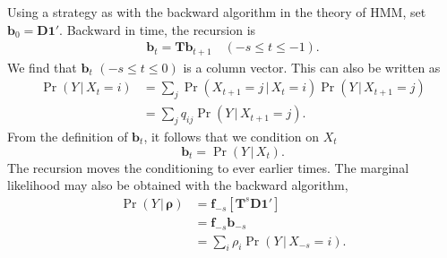 \documentclass[preprint]{elsarticle}
\newcommand{\bs}[1]{\ensuremath{\boldsymbol{#1}}}
\newcommand\given{{\,|\,}}
\newcommand\x[1]{\ensuremath{X_{#1}}}
\newcommand\y{\ensuremath{Y}}
\newcommand\s{\ensuremath{s}}
\newcommand\fv[1]{\ensuremath{\mathbf{f}_{#1}}}
\newcommand\bv[1]{\ensuremath{\mathbf{b}_{#1}}}
\newcommand\oneC{\ensuremath{\mathbf{1}'}}
\newcommand\oneR{\ensuremath{\mathbf{1}}}
\begin{document}
Using a strategy as with the backward algorithm in the theory of HMM, set $\bv{0}=\mathbf{D}\oneC$. Backward in time, the recursion is
\begin{equation}
\begin{split}
\bv{t} = \mathbf{T} \bv{t+1} \quad (-\s \le t \le -1).
\end{split}
\end{equation}
We find that $\bv{t}$ $(-\s \le t \le 0)$ is a column vector. This can also be written as
\begin{equation}\label{eq:backwards_discrete}
\begin{split}
\Pr(\y \given \x{t}=i) &= \sum_j \Pr(\x{t+1}=j \given \x{t}=i) \Pr(\y \given \x{t+1}=j) \\
&=\sum_j q_{ij} \Pr(\y \given \x{t+1}=j).
\end{split}
\end{equation}
From the definition of $\bv{t}$, it follows that we condition on $\x{t}$
\begin{equation}
\bv{t} = \Pr(\y \given \x{t}).
\end{equation}
The recursion moves the conditioning to ever earlier times. The marginal likelihood may also be obtained with the backward algorithm,
\begin{equation}\label{eq:marg_lh}
\begin{split}
\Pr(\y \given \bs{\rho}) &= \fv{-\s} \left[\mathbf{T}^s \mathbf{D}\oneC\right]\\
                         &= \fv{-\s} \bv{-\s}\\
                         &= \sum_i \rho_i \Pr(\y \given \x{-\s}=i).
\end{split}
\end{equation}
\end{document}

